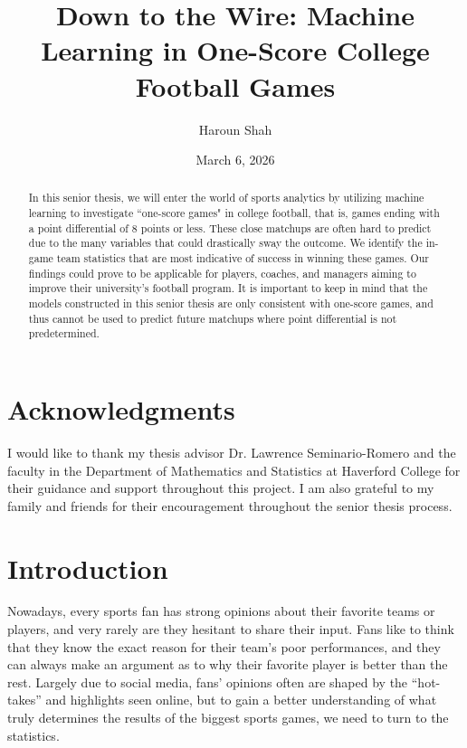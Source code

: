\documentclass[11pt]{amsart}
\title[Down to the Wire: Machine Learning in
One-Score College Football Games]{Down to the Wire: Machine Learning in
One-Score College Football Games} %
\author{Haroun Shah}
\date{March 6, 2026} %
\theoremstyle{definition}                  %
\theoremstyle{remark}                       %
\numberwithin{equation}{section}
\begin{document}
\begin{abstract} %
In this senior thesis, we will enter the world of sports analytics by utilizing machine learning to investigate ``one-score games" in college football, that is, games ending with a point differential of 8 points or less. These close matchups are often hard to predict due to the many variables that could drastically sway the outcome. We identify the in-game team statistics that are most indicative of success in winning these games. Our findings could prove to be applicable for players, coaches, and managers aiming to improve their university's football program. It is important to keep in mind that the models constructed in this senior thesis are only consistent with one-score games, and thus cannot be used to predict future matchups where point differential is not predetermined.
\end{abstract}

\maketitle %

\section*{Acknowledgments}
I would like to thank my thesis advisor Dr. Lawrence Seminario-Romero and the faculty in the Department of Mathematics and Statistics at Haverford College for their guidance and support throughout this project. I am also grateful to my family and friends for their encouragement throughout the senior thesis process.


\tableofcontents %

\section{Introduction}

Nowadays, every sports fan has strong opinions about their favorite teams or players, and very rarely are they hesitant to share their input. Fans like to think that they know the exact reason for their team’s poor performances, and they can always make an argument as to why their favorite player is better than the rest. Largely due to social media, fans' opinions often are shaped by the “hot-takes” and highlights seen online, but to gain a better understanding of what truly determines the results of the biggest sports games, we need to turn to the statistics.
\end{document}

